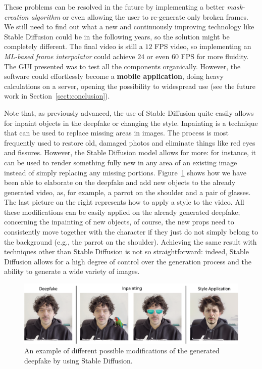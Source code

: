 \documentclass[preprint]{elsarticle}
\begin{document}
These problems can be resolved in the future by implementing a better \emph{mask-creation algorithm} or even allowing the user to re-generate only broken frames. We still need to find out what a new and continuously improving technology like Stable Diffusion could be in the following years, so the solution might be completely different. The final video is still a $12$ FPS video, so implementing an \emph{ML-based frame interpolator} could achieve  $24$ or even $60$ FPS for more fluidity.  The GUI presented was to test all the components organically. However, the software could effortlessly become a \textbf{mobile application}, doing heavy calculations on a server, opening the possibility to widespread use (see the future work in Section~\ref{sect:conclusion}).

Note that, as previously advanced, the use of Stable Diffusion quite easily allows for inpaint objects in the deepfake or changing the style. Inpainting is a technique that can be used to replace missing areas in images. The process is most frequently used to restore old, damaged photos and eliminate things like red eyes and fissures. However, the Stable Diffusion model allows for more: for instance, it can be used to render something fully new in any area of an existing image instead of simply replacing any missing portions. Figure~\ref{fig:options} shows how we have been able to elaborate on the deepfake and add new objects to the already generated video, as, for example, a parrot on the shoulder and a pair of glasses. The last picture on the right represents how to apply a style to the video. All these modifications can be easily applied on the already generated deepfake; concerning the inpainting of new objects, of course, the new props need to consistently move together with the character if they just do not simply belong to the background (e.g., the parrot on the shoulder). Achieving the same result with techniques other than Stable Diffusion is not so straightforward: indeed, Stable Diffusion allows for a high degree of control over the generation process and the ability to generate a wide variety of images.

\begin{figure}
	\centering
	\includegraphics[scale=0.8, keepaspectratio]{img/project_img/FinalDemo.png}
	\caption{An example of different possible modifications of the generated  deepfake by using Stable Diffusion.}\label{fig:options}
\end{figure}
\end{document}
